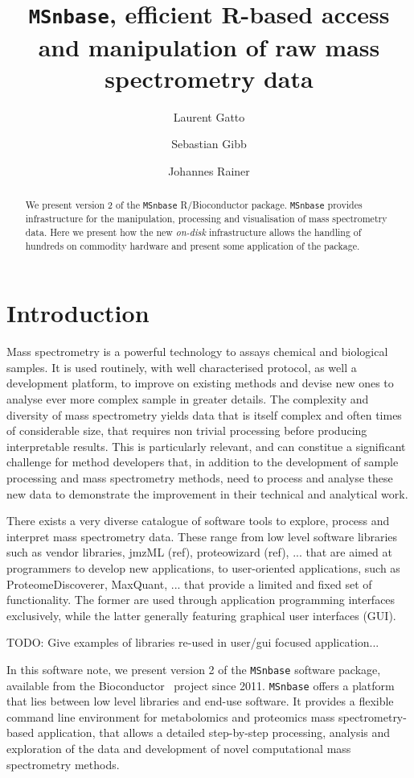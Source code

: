 \documentclass[journal=jacsat,manuscript=article]{achemso}\usepackage[]{graphicx}\usepackage[]{color}
\author{Laurent Gatto}
\affiliation[UCLouvain]{Computational Biology Unit, de Duve Institute, Universit\'e catholique de Louvain, Brussels, Belgium}
\author{Sebastian Gibb}
\affiliation[University of Greifswald]{Department of Anaesthesiology and Intensive Care of the University Medicine Greifswald, Germany}
\author{Johannes Rainer}
\affiliation[EURAC]{Institute for Biomedicine, Eurac Research, Affiliated Institute of the University of L\"ubeck, Bolzano, Italy}
\title[MSnbase version 2]
  {\texttt{MSnbase}, efficient R-based access and manipulation of raw mass spectrometry data}
\begin{document}

\begin{abstract} %
  We present version 2 of the \texttt{MSnbase} R/Bioconductor
  package. \texttt{MSnbase} provides infrastructure for the
  manipulation, processing and visualisation of mass spectrometry
  data. Here we present how the new \textit{on-disk} infrastructure
  allows the handling of hundreds on commodity hardware and present
  some application of the package.
\end{abstract}



\section{Introduction}

Mass spectrometry is a powerful technology to assays chemical and
biological samples. It is used routinely, with well characterised
protocol, as well a development platform, to improve on existing
methods and devise new ones to analyse ever more complex sample in
greater details. The complexity and diversity of mass spectrometry
yields data that is itself complex and often times of considerable
size, that requires non trivial processing before producing
interpretable results. This is particularly relevant, and can
constitue a significant challenge for method developers that, in
addition to the development of sample processing and mass spectrometry
methods, need to process and analyse these new data to demonstrate the
improvement in their technical and analytical work.


There exists a very diverse catalogue of software tools to explore,
process and interpret mass spectrometry data. These range from low
level software libraries such as vendor libraries, jmzML (ref),
proteowizard (ref), ... that are aimed at programmers to develop new
applications, to user-oriented applications, such as
ProteomeDiscoverer, MaxQuant, ... that provide a limited and fixed set
of functionality. The former are used through application programming
interfaces exclusively, while the latter generally featuring graphical
user interfaces (GUI).

TODO: Give examples of libraries re-used in user/gui focused
application...


In this software note, we present version 2 of the \texttt{MSnbase}
\cite{Gatto:2012} software package, available from the
Bioconductor~\cite{Huber:2015} project since 2011. \texttt{MSnbase}
offers a platform that lies between low level libraries and end-use
software. It provides a flexible command line environment for
metabolomics and proteomics mass spectrometry-based application, that
allows a detailed step-by-step processing, analysis and exploration of
the data and development of novel computational mass spectrometry
methods.
\end{document}

